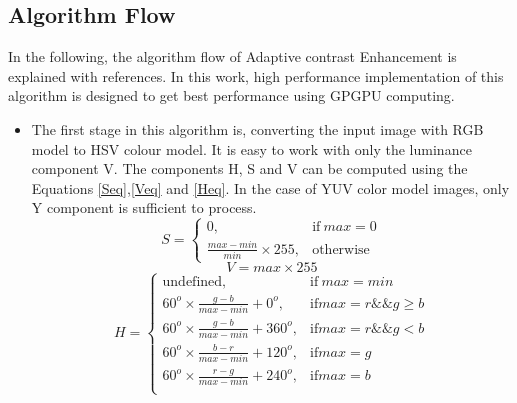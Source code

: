 \subsection{Algorithm Flow}
In the following, the algorithm flow of Adaptive contrast Enhancement is explained with references. In this work, high performance implementation of this algorithm is designed to get best performance using GPGPU computing. 
\begin{itemize}
	\item The first stage in this algorithm is, converting the input image with RGB model to HSV colour model. It is easy to work with only the luminance component V. The components H, S and V can be computed using the Equations \ref{Seq},\ref{Veq} and \ref{Heq}. In the case of YUV color model images, only Y component is sufficient to process.
	\begin{equation}\label{Seq}
	S=
	\begin{cases}
	0, & \text{if}\ max=0 \\
	\frac{max-min}{min} \times 255, & \text{otherwise}
	\end{cases}
	\end{equation}
	\begin{equation}\label{Veq}
	V = max \times 255	
	\end{equation}
	\begin{equation}\label{Heq}
		H=
		\begin{cases}
		\text{undefined}, & \text{if}\ max=min \\
		60^o \times \frac{g-b}{max-min}+0^o, & \text{if} max= r \&\& g\geq b \\
		60^o \times \frac{g-b}{max-min}+360^o, & \text{if} max= r \&\& g < b \\
		60^o \times \frac{b-r}{max-min}+120^o, & \text{if} max= g \\
		60^o \times \frac{r-g}{max-min}+240^o, & \text{if} max= b \\
		\end{cases}
	\end{equation}
		

\end{itemize}
